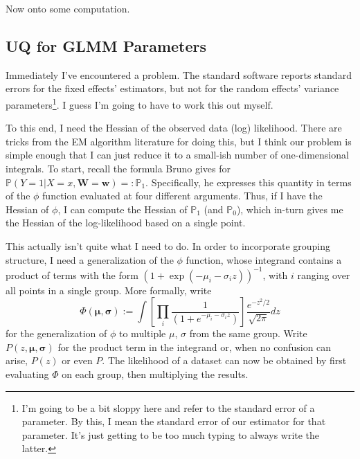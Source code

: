 \documentclass{article}
\newcommand{\bP}{\mathbb{P}}
\begin{document}
Now onto some computation.

\subsection{UQ for GLMM Parameters}

Immediately I've encountered a problem. The standard software reports standard errors for the fixed effects' estimators, but not for the random effects' variance parameters\footnote{I'm going to be a bit sloppy here and refer to the standard error of a parameter. By this, I mean the standard error of our estimator for that parameter. It's just getting to be too much typing to always write the latter.}. I guess I'm going to have to work this out myself.

To this end, I need the Hessian of the observed data (log) likelihood. There are tricks from the EM algorithm literature for doing this, but I think our problem is simple enough that I can just reduce it to a small-ish number of one-dimensional integrals. To start, recall the formula Bruno gives for $\bP(Y=1 | X=x, \mathbf{W}=\mathbf{w}) =: \bP_1$. Specifically, he expresses this quantity in terms of the $\phi$ function evaluated at four different arguments. Thus, if I have the Hessian of $\phi$, I can compute the Hessian of $\bP_1$ (and $\bP_0$), which in-turn gives me the Hessian of the log-likelihood based on a single point. 

This actually isn't quite what I need to do. In order to incorporate grouping structure, I need a generalization of the $\phi$ function, whose integrand contains a product of terms with the form $(1 + \exp(-\mu_i - \sigma_i z))^{-1}$, with $i$ ranging over all points in a single group. More formally, write
%
\begin{equation}
    \Phi(\bm{\mu}, \bm{\sigma}) := \int \left[ \prod_i \frac{1}{\left( 1 + e^{-\mu_i - \sigma_i z} \right)} \right] \frac{e^{-z^2/2}}{\sqrt{2\pi}} dz
\end{equation}
%
for the generalization of $\phi$ to multiple $\mu$, $\sigma$ from the same group. Write $P(z, \bm{\mu}, \bm{\sigma})$ for the product term in the integrand or, when no confusion can arise, $P(z)$ or even $P$. The likelihood of a dataset can now be obtained by first evaluating $\Phi$ on each group, then multiplying the results.
\end{document}

